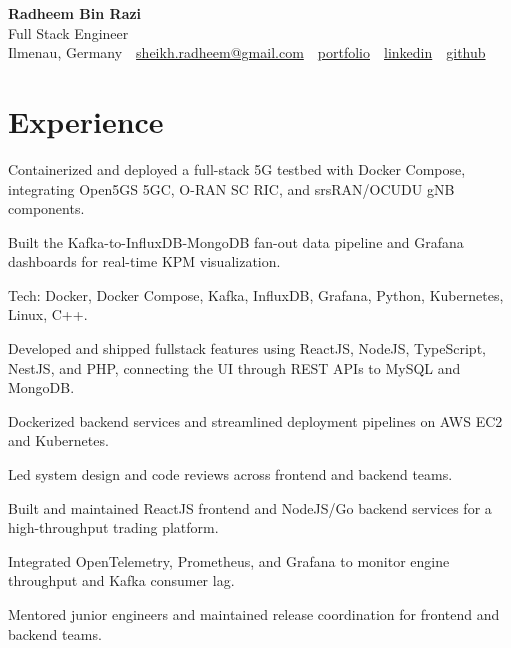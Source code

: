 \documentclass[10pt,a4paper]{resume}
\makeatletter
\newcommand{\Portfolio}{https://radheem.github.io/my-cv}
\newcommand{\PortfolioText}{portfolio}
\newcommand{\GitHub}{https://github.com/radheem}
\newcommand{\LinkedIn}{https://www.linkedin.com/in/radheem-razi}
\newcommand{\Email}{sheikh.radheem@gmail.com}
\makeatother
\begin{document}
\begin{center}
  {\huge\bfseries Radheem Bin Razi}\\[3pt]
  {\large Full Stack Engineer}\\[6pt]
  \small
  Ilmenau, Germany \,\textbar\,
  \href{mailto:\Email}{\Email} \,\textbar\,
  \href{\Portfolio}{\PortfolioText} \,\textbar\,
  \href{\LinkedIn}{linkedin} \,\textbar\,
  \href{\GitHub}{github}
\end{center}
\vspace{2pt}

\section{Experience}

\bullets
  \item Containerized and deployed a full-stack 5G testbed with Docker Compose, integrating Open5GS 5GC, O-RAN SC RIC, and srsRAN/OCUDU gNB components.
  \item Built the Kafka-to-InfluxDB-MongoDB fan-out data pipeline and Grafana dashboards for real-time KPM visualization.
  \item Tech: Docker, Docker Compose, Kafka, InfluxDB, Grafana, Python, Kubernetes, Linux, C++.
\bulletsend
\vspace{1.5pt}
\bullets
  \item Developed and shipped fullstack features using ReactJS, NodeJS, TypeScript, NestJS, and PHP, connecting the UI through REST APIs to MySQL and MongoDB.
  \item Dockerized backend services and streamlined deployment pipelines on AWS EC2 and Kubernetes.
  \item Led system design and code reviews across frontend and backend teams.
\bulletsend
\vspace{1.5pt}
\bullets
  \item Built and maintained ReactJS frontend and NodeJS/Go backend services for a high-throughput trading platform.
  \item Integrated OpenTelemetry, Prometheus, and Grafana to monitor engine throughput and Kafka consumer lag.
  \item Mentored junior engineers and maintained release coordination for frontend and backend teams.
\bulletsend
\vspace{1.5pt}
\end{document}
